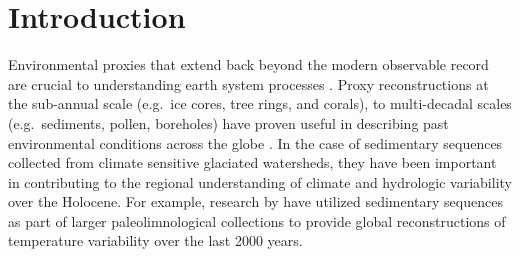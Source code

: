 \documentclass[Royal,times,doublespace,sageh]{sagej}
\begin{document}

\maketitle

\hypertarget{introduction}{%
\section{Introduction}\label{introduction}}

Environmental proxies that extend back beyond the modern observable
record are crucial to understanding earth system processes
\citep{Turney2019, Huber2012, Nelson2016}. Proxy reconstructions at the
sub-annual scale (e.g.~ice cores, tree rings, and corals), to
multi-decadal scales (e.g.~sediments, pollen, boreholes) have proven
useful in describing past environmental conditions across the globe
\citep{Masson2013}. In the case of sedimentary sequences collected from
climate sensitive glaciated watersheds, they have been important in
contributing to the regional understanding of climate and hydrologic
variability over the Holocene. For example, research by
\citet{Neukom2019} have utilized sedimentary sequences as part of larger
paleolimnological collections to provide global reconstructions of
temperature variability over the last 2000 years.
\end{document}

